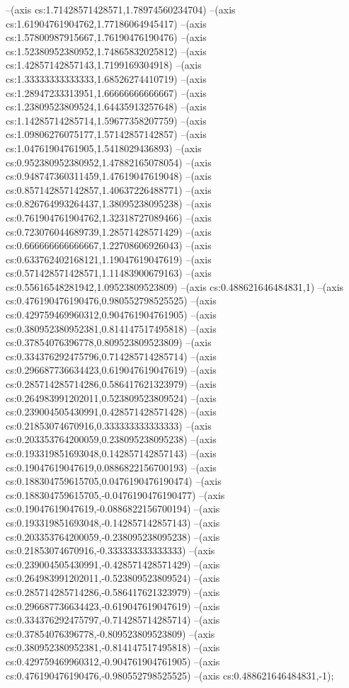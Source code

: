--(axis cs:1.71428571428571,1.78974560234704)
--(axis cs:1.61904761904762,1.77186064945417)
--(axis cs:1.57800987915667,1.76190476190476)
--(axis cs:1.52380952380952,1.74865832025812)
--(axis cs:1.42857142857143,1.7199169304918)
--(axis cs:1.33333333333333,1.68526274410719)
--(axis cs:1.28947233313951,1.66666666666667)
--(axis cs:1.23809523809524,1.64435913257648)
--(axis cs:1.14285714285714,1.59677358207759)
--(axis cs:1.09806276075177,1.57142857142857)
--(axis cs:1.04761904761905,1.5418029436893)
--(axis cs:0.952380952380952,1.47882165078054)
--(axis cs:0.948747360311459,1.47619047619048)
--(axis cs:0.857142857142857,1.40637226488771)
--(axis cs:0.826764993264437,1.38095238095238)
--(axis cs:0.761904761904762,1.32318727089466)
--(axis cs:0.723076044689739,1.28571428571429)
--(axis cs:0.666666666666667,1.22708606926043)
--(axis cs:0.633762402168121,1.19047619047619)
--(axis cs:0.571428571428571,1.11483900679163)
--(axis cs:0.55616548281942,1.09523809523809)
--(axis cs:0.488621646484831,1)
--(axis cs:0.476190476190476,0.980552798525525)
--(axis cs:0.429759469960312,0.904761904761905)
--(axis cs:0.380952380952381,0.814147517495818)
--(axis cs:0.37854076396778,0.809523809523809)
--(axis cs:0.334376292475796,0.714285714285714)
--(axis cs:0.296687736634423,0.619047619047619)
--(axis cs:0.285714285714286,0.586417621323979)
--(axis cs:0.264983991202011,0.523809523809524)
--(axis cs:0.239004505430991,0.428571428571428)
--(axis cs:0.21853074670916,0.333333333333333)
--(axis cs:0.203353764200059,0.238095238095238)
--(axis cs:0.193319851693048,0.142857142857143)
--(axis cs:0.19047619047619,0.0886822156700193)
--(axis cs:0.188304759615705,0.0476190476190474)
--(axis cs:0.188304759615705,-0.0476190476190477)
--(axis cs:0.19047619047619,-0.0886822156700194)
--(axis cs:0.193319851693048,-0.142857142857143)
--(axis cs:0.203353764200059,-0.238095238095238)
--(axis cs:0.21853074670916,-0.333333333333333)
--(axis cs:0.239004505430991,-0.428571428571429)
--(axis cs:0.264983991202011,-0.523809523809524)
--(axis cs:0.285714285714286,-0.586417621323979)
--(axis cs:0.296687736634423,-0.619047619047619)
--(axis cs:0.334376292475797,-0.714285714285714)
--(axis cs:0.37854076396778,-0.809523809523809)
--(axis cs:0.380952380952381,-0.814147517495818)
--(axis cs:0.429759469960312,-0.904761904761905)
--(axis cs:0.476190476190476,-0.980552798525525)
--(axis cs:0.488621646484831,-1);

